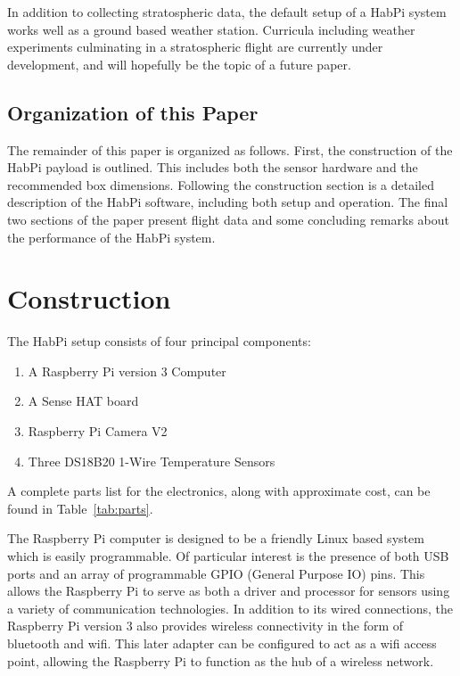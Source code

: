 \documentclass[journal]{new-aiaa}
\begin{document}
In addition to collecting stratospheric data, the default setup of
a HabPi system works well as a ground based weather station.
Curricula including weather experiments culminating in a stratospheric
flight are currently under development, and will hopefully be the topic
of a future paper.

\subsection{Organization of this Paper}
The remainder of this paper is organized as follows.  First, the
construction of the HabPi payload is outlined.  This includes both the
sensor hardware and the recommended box dimensions.  Following the
construction section is a detailed description of the HabPi software,
including both setup and operation.  The final two sections of the
paper present flight data and some concluding remarks about the
performance of the HabPi system. 

\section{Construction}
The HabPi setup consists of four principal components:
\begin{enumerate}
    \item A Raspberry Pi version 3 Computer~\cite{RaspberryPi}
    \item A Sense HAT board~\cite{SenseHat}
    \item Raspberry Pi Camera V2~\cite{RaspberryPi}
    \item Three DS18B20 1-Wire Temperature Sensors~\cite{DS18B20}
\end{enumerate}
A complete parts list for the electronics, along with approximate
cost, can be found in Table~\ref{tab:parts}.

The Raspberry Pi computer is designed to be a friendly Linux based
system which is easily programmable.  Of particular interest is the
presence of both USB ports and an array of programmable GPIO (General
Purpose IO) pins.  This allows the Raspberry Pi to serve as both
a driver and processor for sensors using a variety of communication
technologies.  In addition to its wired connections, the Raspberry Pi
version 3 also provides wireless connectivity in the form of bluetooth
and wifi.  This later adapter can be configured to act as a wifi
access point, allowing the Raspberry Pi to function as the hub of
a wireless network.
\end{document}
